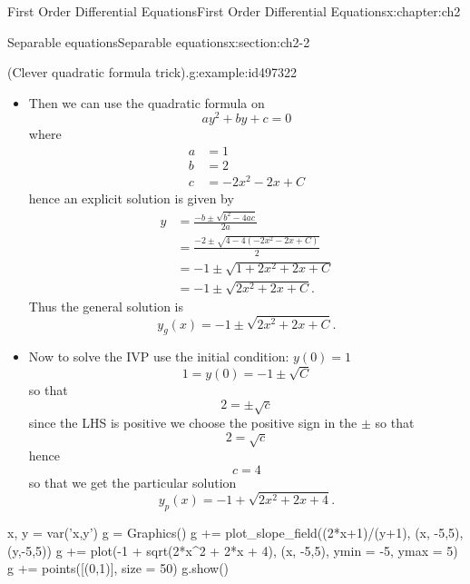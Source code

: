 \documentclass[oneside,10pt,]{book}
\numberwithin{equation}{section}
\numberwithin{equation}{section}
\newcommand{\amp}{&}
\begin{document}
\begin{chapterptx}{First Order Differential Equations}{}{First Order Differential Equations}{}{}{x:chapter:ch2}
\begin{sectionptx}{Separable equations}{}{Separable equations}{}{}{x:section:ch2-2}
\begin{example}{(Clever quadratic formula trick).}{g:example:id497322}
\begin{itemize}[label=\textbullet]
\begin{align*}
\amp \iff \amp \frac{y^{2}}{2}+y=x^{2}+x+C\\
\amp \iff \amp \frac{y^{2}}{2}+y-x^{2}-x+c=0\\
\amp \iff \amp y^{2}+2y-2x^{2}-2x+C=0
\end{align*}
%
\item{}Then we can use the quadratic formula on%
\begin{equation*}
ay^{2}+by+c=0
\end{equation*}
where%
\begin{align*}
a \amp =1\\
b \amp =2\\
c \amp =-2x^{2}-2x+C
\end{align*}
hence an explicit solution is given by%
\begin{align*}
y \amp =\frac{-b\pm\sqrt{b^{2}-4ac}}{2a}\\
\amp =\frac{-2\pm\sqrt{4-4\left(-2x^{2}-2x+C\right)}}{2}\\
\amp =-1\pm\sqrt{1+2x^{2}+2x+C}\\
\amp =-1\pm\sqrt{2x^{2}+2x+C}.
\end{align*}
Thus the general solution is%
\begin{equation*}
y_g(x)=-1\pm\sqrt{2x^{2}+2x+C}.
\end{equation*}
%
\item{}Now to solve the IVP use the initial condition: \(y(0)=1\)%
\begin{equation*}
1=y(0)=-1\pm\sqrt{C}
\end{equation*}
so that%
\begin{equation*}
2=\pm\sqrt{c}
\end{equation*}
since the LHS is positive we choose the positive sign in the \(\pm\) so that%
\begin{equation*}
2=\sqrt{c}
\end{equation*}
hence%
\begin{equation*}
c=4
\end{equation*}
so that we get the particular solution%
\begin{equation*}
y_p(x)=-1+\sqrt{2x^{2}+2x+4}.
\end{equation*}
%
\end{itemize}
\begin{sageinput}
x, y = var('x,y')
g = Graphics()
g += plot_slope_field((2*x+1)/(y+1), (x, -5,5),(y,-5,5))
g += plot(-1 + sqrt(2*x^2 + 2*x + 4), (x, -5,5), ymin = -5, ymax = 5)
g += points([(0,1)], size = 50)
g.show()
\end{sageinput}
\end{example}

\end{sectionptx}
\end{chapterptx}
\end{document}
